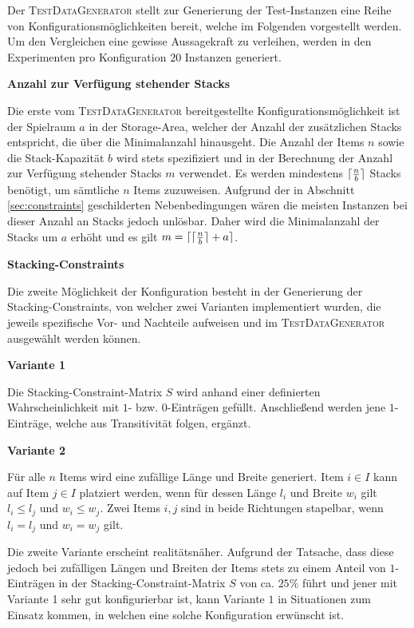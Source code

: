 Der \textsc{TestDataGenerator} stellt zur Generierung der Test-Instanzen eine Reihe von Konfigurationsmöglichkeiten
bereit, welche im Folgenden vorgestellt werden. Um den Vergleichen eine gewisse Aussagekraft zu verleihen,
werden in den Experimenten pro Konfiguration $20$ Instanzen generiert.

\textbf{Anzahl zur Verfügung stehender Stacks}

Die erste vom \textsc{TestDataGenerator} bereitgestellte Konfigurationsmöglichkeit ist der Spielraum $a$ in der Storage-Area, welcher der Anzahl der zusätzlichen Stacks entspricht, die über die Minimalanzahl hinausgeht.
Die Anzahl der Items $n$ sowie die Stack-Kapazität $b$ wird stets spezifiziert und in der Berechnung der Anzahl zur Verfügung stehender Stacks $m$ verwendet. Es werden mindestens $\lceil\frac{n}{b}\rceil$ Stacks benötigt, um sämtliche $n$ Items zuzuweisen.
Aufgrund der in Abschnitt \ref{sec:constraints} geschilderten Nebenbedingungen wären die meisten Instanzen bei dieser
Anzahl an Stacks jedoch unlösbar. Daher wird die Minimalanzahl der Stacks um $a$ erhöht und es gilt
$m = \lceil\lceil\frac{n}{b}\rceil + a\rceil$.

\textbf{Stacking-Constraints}

Die zweite Möglichkeit der Konfiguration besteht in der Generierung der Stacking-Constraints,
von welcher zwei Varianten implementiert wurden, die jeweils spezifische Vor- und Nachteile aufweisen
und im \textsc{TestDataGenerator} ausgewählt werden können.

\textbf{Variante 1}

Die Stacking-Constraint-Matrix $S$ wird anhand einer definierten Wahrscheinlichkeit mit $1$- bzw. $0$-Einträgen gefüllt. Anschließend werden jene $1$-Einträge, welche aus Transitivität folgen, ergänzt.

\textbf{Variante 2}

Für alle $n$ Items wird eine zufällige Länge und Breite generiert. Item $i \in I$ kann auf Item $j \in I$
platziert werden, wenn für dessen Länge $l_i$ und Breite $w_i$ gilt $l_i \leq l_j$ und $w_i \leq w_j$.
Zwei Items $i, j$ sind in beide Richtungen stapelbar, wenn $l_i = l_j$ und $w_i = w_j$ gilt.

\vfill
\pagebreak

Die zweite Variante erscheint realitätsnäher. Aufgrund der Tatsache, dass diese jedoch bei zufälligen Längen und
Breiten der Items stets zu einem Anteil von $1$-Einträgen in der Stacking-Constraint-Matrix $S$ von ca. $25\%$ führt
und jener mit Variante 1 sehr gut konfigurierbar ist, kann Variante $1$ in Situationen zum Einsatz kommen,
in welchen eine solche Konfiguration erwünscht ist.


